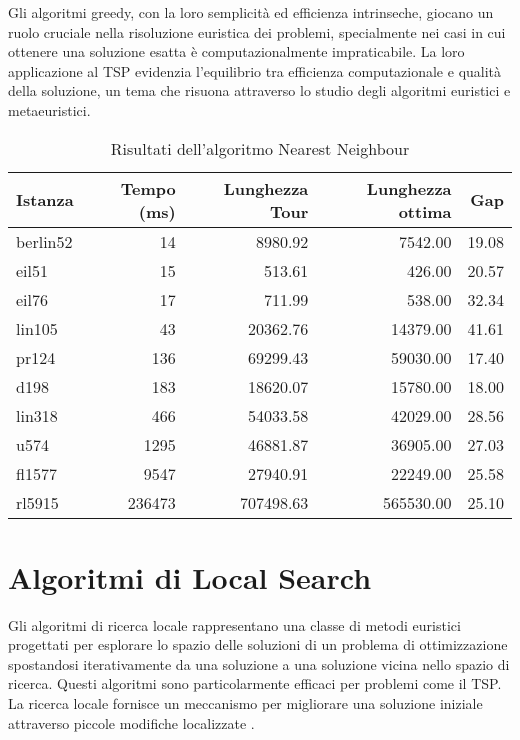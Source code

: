 Gli algoritmi greedy, con la loro semplicità ed efficienza intrinseche, giocano un ruolo cruciale nella risoluzione euristica dei problemi, specialmente nei casi in cui ottenere una soluzione esatta è computazionalmente impraticabile. La loro applicazione al \gls{TSP} evidenzia l'equilibrio tra efficienza computazionale e qualità della soluzione, un tema che risuona attraverso lo studio degli algoritmi euristici e metaeuristici.


\begin{table}
	\centering
	\caption{Risultati dell'algoritmo Nearest Neighbour}
	\begin{tabular}{lrrrr}
		\toprule
		Istanza  & Tempo (ms) & Lunghezza Tour & Lunghezza ottima & Gap   \\
		\midrule
		berlin52 & 14         & 8980.92        & 7542.00          & 19.08 \\
		eil51    & 15         & 513.61         & 426.00           & 20.57 \\
		eil76    & 17         & 711.99         & 538.00           & 32.34 \\
		lin105   & 43         & 20362.76       & 14379.00         & 41.61 \\
		pr124    & 136        & 69299.43       & 59030.00         & 17.40 \\
		d198     & 183        & 18620.07       & 15780.00         & 18.00 \\
		lin318   & 466        & 54033.58       & 42029.00         & 28.56 \\
		u574     & 1295       & 46881.87       & 36905.00         & 27.03 \\
		fl1577   & 9547       & 27940.91       & 22249.00         & 25.58 \\
		rl5915   & 236473     & 707498.63      & 565530.00        & 25.10 \\
		\bottomrule
	\end{tabular}
\end{table}


\section{Algoritmi di Local Search}

Gli algoritmi di ricerca locale rappresentano una classe di metodi euristici progettati per esplorare lo spazio delle soluzioni di un problema di ottimizzazione spostandosi iterativamente da una soluzione a una soluzione vicina nello spazio di ricerca. Questi algoritmi sono particolarmente efficaci per problemi come il \gls{TSP}. La ricerca locale fornisce un meccanismo per migliorare una soluzione iniziale attraverso piccole modifiche localizzate \cite{Johnson2002,Lawler1985}.


